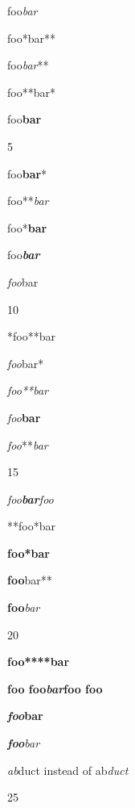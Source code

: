 
\def\mytitle{Advanced Emph and Strong}


foo\emph{bar}

foo*bar**

foo\emph{bar}**

foo**bar*

foo\textbf{bar}

5

foo\textbf{bar}*

foo**\emph{bar}

foo*\textbf{bar}

foo\textbf{\emph{bar}}

\emph{foo}bar

10

*foo**bar

\emph{foo}bar*

\emph{foo**bar}

\emph{foo}\textbf{bar}

\emph{foo}**\emph{bar}

15

\emph{foo\textbf{bar}foo}

**foo*bar

\textbf{foo*bar}

\textbf{foo}bar**

\textbf{foo}\emph{bar}

20

\textbf{foo****bar}

\textbf{foo foo\emph{bar}foo foo}

\textbf{\emph{foo}bar}

\emph{\textbf{foo}bar}

\emph{ab}duct instead of ab\emph{duct}

25


